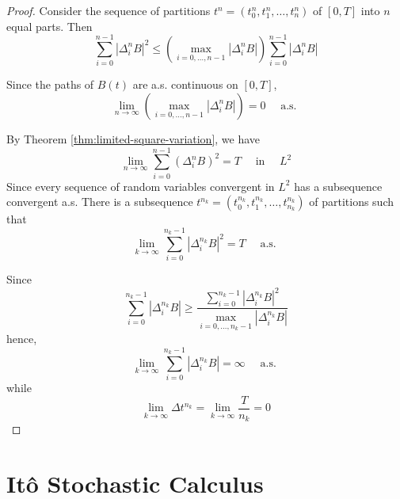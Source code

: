 \begin{proof}
    Consider the sequence of partitions $t^{n}=\left(t_{0}^{n},t_{1}^{n},\ldots,t_{n}^{n}\right)$ of $[0,T]$ into $n$ equal parts. Then
    \begin{equation*}
        \sum_{i=0}^{n-1}\left|\Delta_{i}^{n}B\right|^{2}\leq\left(\max_{i=0,\ldots,n-1}\left|\Delta_{i}^{n}B\right|\right)\sum_{i=0}^{n-1}\left|\Delta_{i}^{n}B\right|
    \end{equation*}

    Since the paths of $B(t)$ are a.s. continuous on $[0,T]$,
    \begin{equation*}
        \lim_{n\rightarrow\infty}\left(\max_{i=0,\ldots,n-1}\left|\Delta_{i}^{n}B\right|\right)=0\quad\text{ a.s. }
    \end{equation*}

    By Theorem \ref{thm:limited-square-variation}, we have
    \begin{equation*}
        \lim_{n\rightarrow\infty}\sum_{i=0}^{n-1}\left(\Delta_{i}^{n}B\right)^{2}=T\quad\text { in }\quad L^{2}
    \end{equation*}
    Since every sequence of random variables convergent in $L^{2}$ has a subsequence convergent a.s. There is a subsequence $t^{n_{k}}=\left(t_{0}^{n_{k}},t_{1}^{n_{k}},\ldots,t_{n_{k}}^{n_{k}}\right)$ of partitions such that
    \begin{equation*}
        \lim_{k\rightarrow\infty}\sum_{i=0}^{n_{k}-1}\left|\Delta_{i}^{n_{k}}B\right|^{2}=T\quad\text{ a.s. }
    \end{equation*}

    Since
    \begin{equation*}
        \sum_{i=0}^{n_{k}-1}\left|\Delta_{i}^{n_{k}}B\right|\geq\frac{\sum_{i=0}^{n_{k}-1}\left|\Delta_{i}^{n_{k}}B\right|^{2}}{\max_{i=0,\ldots,n_{k}-1}\left|\Delta_{i}^{n_{k}}B\right|}
    \end{equation*}
    hence,
    \begin{equation*}
        \lim_{k\rightarrow\infty}\sum_{i=0}^{n_{k}-1}\left|\Delta_{i}^{n_{k}}B\right|=\infty\quad\text{ a.s. }
    \end{equation*}
    while
    \begin{equation*}
        \lim_{k\rightarrow\infty}\Delta t^{n_{k}}=\lim_{k\rightarrow\infty}\frac{T}{n_{k}}=0
    \end{equation*}
\end{proof}

\section{It\^o Stochastic Calculus}

